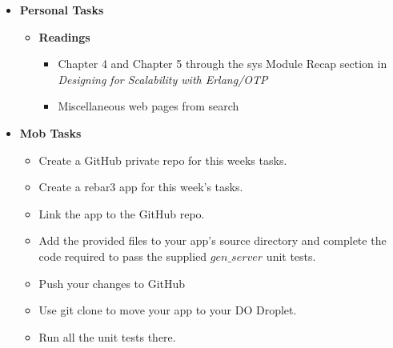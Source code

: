 \documentclass[12pt]{amsart}
\begin{document}
    	\begin{itemize}
	\item\textbf{ Personal Tasks}
	\begin{itemize}
    		\item \textbf{Readings}
            	\begin{itemize}
            		\item Chapter 4 and Chapter 5 through the sys Module Recap section in \textit{Designing for Scalability with Erlang/OTP}
            		\item Miscellaneous web pages from search
            	\end{itemize}
            	\end{itemize}
	\end{itemize}
	
	\begin{itemize}
		\item \textbf{Mob Tasks}
		\begin{itemize}
			\item Create a GitHub private repo for this weeks tasks.
			\item Create a rebar3 app for this week's tasks.
			\item Link the app to the GitHub repo.
			\item Add the provided files to your app's source directory and complete the code required to pass the supplied $gen\_server$ unit tests.
			\item Push your changes to GitHub
			\item Use git clone to move your app to your DO Droplet.
			\item Run all the unit tests there.
		\end{itemize}
	\end{itemize}
\end{document}
